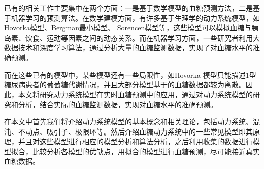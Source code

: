 已有的相关工作主要集中在两个方面：一是基于数学模型的血糖预测方法，二是基于机器学习的预测算法。在数学建模方面，有许多基于生理学的动力系统模型，如Hovorka模型、Bergman最小模型、 Sorencen模型等\cite{pompa2021comparison,mari2001model,de2000mathematical}，这些模型可以模拟血糖与胰岛素、饮食、运动等因素之间的动态关系。而在机器学习方面，一些研究者利用大数据技术和深度学习算法，通过分析大量的血糖监测数据，实现了对血糖水平的准确预测。

而在这些已有的模型中，某些模型还有一些局限性，如Hovorka 模型只能描述1型糖尿病患者的葡萄糖代谢情况，并且大部分模型基于的血糖数据都较为离散。因此，本文将研究动力系统模型在实时血糖预测中的应用，通过对动力系统模型的研究和分析，结合实际的血糖监测数据，实现对血糖水平的准确预测。

在本文中首先我们将介绍动力系统模型的基本概念和相关理论，包括动力系统、混沌、不动点、吸引子、极限环等。然后介绍血糖动力系统中的一些常见模型即其原理，并且对这些模型进行相应的模型分析和算法分析，之后利用收集的数据进行模型拟合，比较分析各模型的优缺点，用拟合的模型进行血糖预测，尽可能接近真实血糖数据。